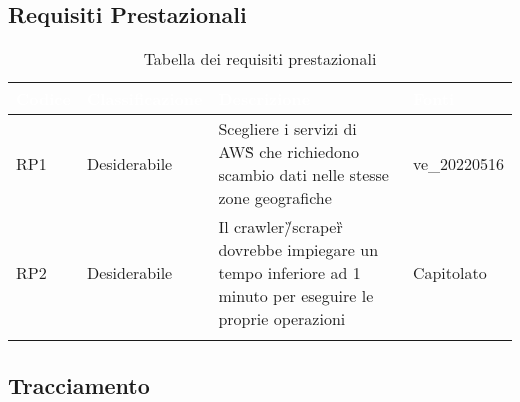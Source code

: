 \subsection{Requisiti Prestazionali}
{
      \setlength{\freewidth}{\dimexpr\textwidth-10\tabcolsep}
      \renewcommand{\arraystretch}{1.5}
      \centering
      \setlength{\aboverulesep}{0pt}
      \setlength{\belowrulesep}{0pt}
      \begin{longtable}{C{.15\freewidth} C{.2\freewidth} C{.528\freewidth} C{.15\freewidth}}
         \toprule
      \textcolor{white}{\textbf{Codice}}&
      \textcolor{white}{\textbf{Classificazione}}&
      \textcolor{white}{\textbf{Descrizione}}&
      \textcolor{white}{\textbf{Fonti}}\\	
      \toprule
      \endhead
      
      RP1 & Desiderabile & Scegliere i servizi di AWS\G{} che richiedono scambio dati nelle stesse zone geografiche & ve\_20220516 \\
      RP2 & Desiderabile & Il crawler\G/scraper\G{} dovrebbe impiegare un tempo inferiore ad 1 minuto per eseguire le proprie operazioni & Capitolato \\	   
      \bottomrule
      \caption{Tabella dei requisiti prestazionali}
      \end{longtable}
}
\subsection{Tracciamento}

